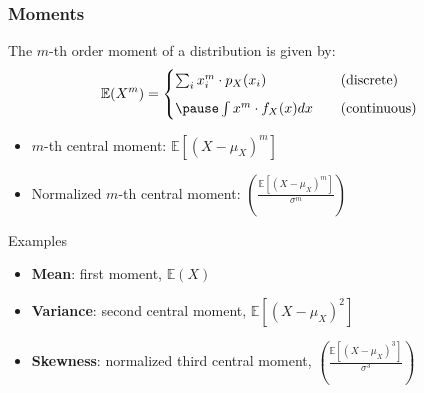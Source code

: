 \documentclass[usenames,dvipsnames,smaller%
]{beamer}
\newcommand{\lt}{\left}
\newcommand{\rt}{\right}
\newcommand{\?}{\stackrel{?}{=}}
\newcommand{\fr}{\frac}
\begin{document}
\begin{frame}
  \frametitle{Moments}
  \pause
  The $m$-th order moment of a distribution is given by: \pause
  \begin{equation}
    \mathbb{E}(X^{m}) =
    \begin{cases}
      \sum_{i}x_{i}^{m} \cdot p_{X}(x_{i}) & \quad \text{(discrete)} \\[2mm] \pause
      \int x^{m}\cdot f_{X}(x) dx & \quad \text{(continuous)}
    \end{cases}
  \end{equation}
  \pause

  \begin{itemize}[<+->]
  \item $m$-th central moment: $\mathbb{E}[(X - \mu_{X})^{m}]$
  \item Normalized $m$-th central moment: $\lt(\fr{\mathbb{E}[(X-\mu_{X})^{m}]}{\sigma^{m}}\rt)$
  \end{itemize}
  \pause

  \begin{exampleblock}{Examples}\pause
    \begin{itemize}
    \item \textbf{Mean}: first moment, \pause $\mathbb{E}(X)$ \pause
    \item \textbf{Variance}: second central moment, \pause $\mathbb{E}[(X-\mu_{X})^{2}]$\pause
    \item \textbf{Skewness}: normalized third central moment, \pause $\lt(\fr{\mathbb{E}[(X-\mu_{X})^{3}]}{\sigma^{3}}\rt)$
    \end{itemize}
  \end{exampleblock}
\end{frame}





\end{document}
